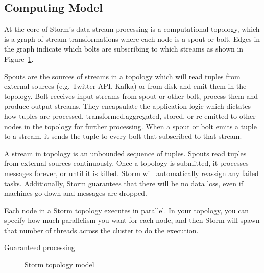 \subsection{Computing Model}

At the core of Storm's data stream processing is a computational topology,  which is a graph of stream transformations where each node is a spout or bolt. Edges in the graph indicate which bolts are subscribing to which streams as shown in Figure~\ref{fig:storm_model}.

Spouts are the sources of streams in a topology which will read tuples from external sources (e.g. Twitter API, Kafka) or from disk and emit them in the topology. Bolt receives input streams from spout or other bolt, process them and produce output streams. They encapsulate the application logic which dictates how tuples are processed, transformed,aggregated, stored, or re-emitted to other nodes in the topology for further processing. When a spout or bolt emits a tuple to a stream, it sends the tuple to every bolt that subscribed to that stream.

A stream in topology is an unbounded sequence of tuples. Spouts read tuples from external sources continuously. Once a topology is submitted, it processes messages forever, or until it is killed. Storm will automatically reassign any failed tasks. Additionally, Storm guarantees that there will be no data loss, even if machines go down and messages are dropped.

Each node in a Storm topology executes in parallel. In your topology, you can specify how much parallelism you want for each node, and then Storm will spawn that number of threads across the cluster to do the execution.

Guaranteed processing

\begin{figure}
  \begin{center}
   \caption{Storm topology model}
   \label{fig:storm_model}
  \end{center}
\end{figure}

